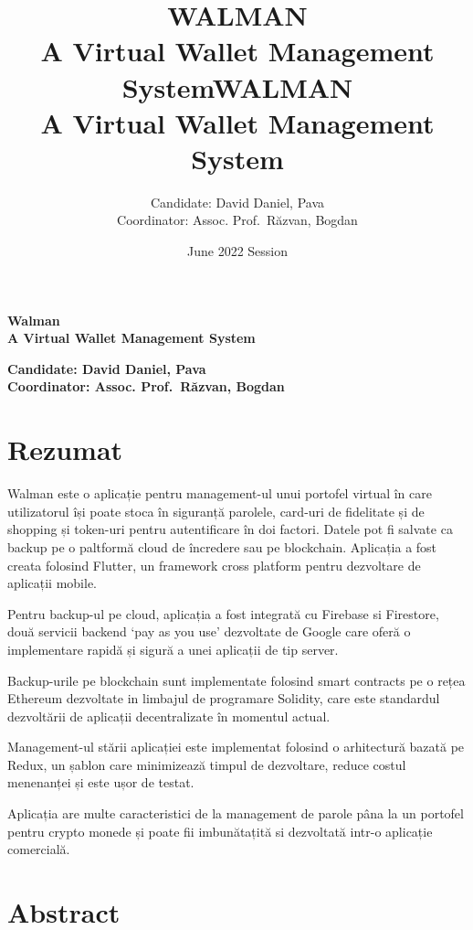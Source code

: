 \documentclass[a4paper,12pt]{report}
\title{\LARGE WALMAN\\{ A Virtual Wallet Management System}}
\title{\LARGE WALMAN\\{ A Virtual Wallet Management System}}
\author{Candidate: David Daniel, Pava
    \\Coordinator: Assoc. Prof.\ Răzvan, Bogdan}
\date{June 2022 Session}
\begin{document}
\begin{titlepage}
    \thispagestyle{titlepage}
    \begin{center}
        \vspace*{10cm}
        \LARGE\textbf{Walman\\A Virtual Wallet Management System}\\
        \vfill
    \end{center}
    \begin{flushleft}
        \large\textbf{Candidate: David Daniel, Pava
            \\Coordinator: Assoc. Prof.\ Răzvan, Bogdan}
    \end{flushleft}

\end{titlepage}

\chapter*{Rezumat}

\bigskip
\bigskip
\bigskip

Walman este o aplicație pentru management-ul unui portofel virtual în care
utilizatorul își poate stoca în siguranță parolele, card-uri de fidelitate și
de shopping și token-uri pentru autentificare în doi factori. Datele pot fi
salvate ca backup pe o paltformă cloud de încredere sau pe blockchain.
Aplicația a fost creata folosind Flutter, un framework cross platform pentru
dezvoltare de aplicații mobile.

Pentru backup-ul pe cloud, aplicația a fost integrată cu Firebase si Firestore,
două servicii backend `pay as you use' dezvoltate de Google care oferă o
implementare rapidă și sigură a unei aplicații de tip server.

Backup-urile pe blockchain sunt implementate folosind smart contracts pe o
rețea Ethereum dezvoltate in limbajul de programare Solidity, care este
standardul dezvoltării de aplicații decentralizate în momentul actual.

Management-ul stării aplicației este implementat folosind o arhitectură bazată
pe Redux, un șablon care minimizează timpul de dezvoltare, reduce costul
menenanței și este ușor de testat.

Aplicația are multe caracteristici de la management de parole pâna la un
portofel pentru crypto monede și poate fii imbunătațită si dezvoltată intr-o
aplicație comercială.

\chapter*{Abstract}
\end{document}
